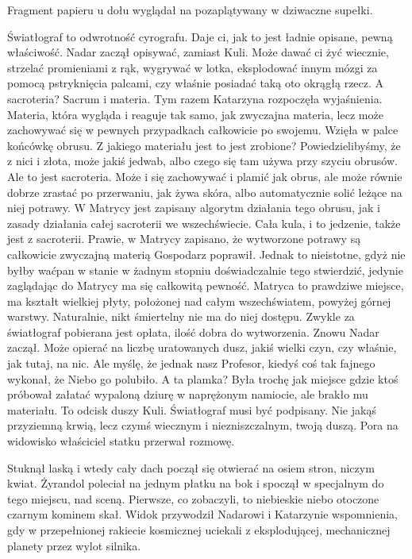 Fragment papieru u dołu wyglądał na pozaplątywany w dziwaczne supełki.

\begin{dialogue}
\ds{} Światłograf to odwrotność cyrografu. Daje ci, jak to jest ładnie opisane, pewną właściwość. \dm{} Nadar zaczął opisywać, zamiast Kuli. \dm{}
Może dawać ci żyć wiecznie, strzelać promieniami z rąk, wygrywać w lotka, eksplodować innym mózgi za pomocą pstryknięcia palcami, czy właśnie posiadać taką oto okrągłą rzecz.
\ds{} A sacroteria? 
\ds{} Sacrum i materia. \dm{} Tym razem Katarzyna rozpoczęła wyjaśnienia. \dm{} 
Materia, która wygląda i reaguje tak samo, jak zwyczajna materia, lecz może zachowywać się w pewnych przypadkach całkowicie po swojemu. \dm{} 
Wzięła w palce końcówkę obrusu. \dm{} Z jakiego materiału jest to jest zrobione? 
Powiedzielibyśmy, że z nici i złota, może jakiś jedwab, albo czego się tam używa przy szyciu obrusów.
Ale to jest sacroteria. Może i się zachowywać i plamić jak obrus, ale może równie dobrze zrastać po przerwaniu, jak żywa skóra, albo automatycznie solić leżące na niej potrawy.
W Matrycy jest zapisany algorytm działania tego obrusu, jak i zasady działania całej sacroterii we wszechświecie. 
Cała kula, i to jedzenie, także jest z sacroterii.
\ds{} Prawie, w Matrycy zapisano, że wytworzone potrawy są całkowicie zwyczajną materią \dm{} Gospodarz poprawił. \dm{}
Jednak to nieistotne, gdyż nie byłby waćpan w stanie w żadnym stopniu doświadczalnie tego stwierdzić, jedynie zaglądając do Matrycy ma się całkowitą pewność. 
Matryca to prawdziwe miejsce, ma kształt wielkiej płyty, położonej nad całym wszechświatem, powyżej górnej warstwy. Naturalnie, nikt śmiertelny nie ma do niej dostępu.
\ds{} Zwykle za światłograf pobierana jest opłata, ilość dobra do wytworzenia. \dm{} Znowu Nadar zaczął. \dm{} 
Może opierać na liczbę uratowanych dusz, jakiś wielki czyn, czy właśnie, jak tutaj, na nic. 
Ale myślę, że jednak nasz Profesor, kiedyś coś tak fajnego wykonał, że Niebo go polubiło.
\ds{} A ta plamka? \dm{} Była trochę jak miejsce gdzie ktoś próbował załatać wypaloną dziurę w naprężonym namiocie, ale brakło mu materiału.
\ds{} To odcisk duszy Kuli. Światłograf musi być podpisany. Nie jakąś przyziemną krwią, lecz czymś wiecznym i niezniszczalnym, twoją duszą.
\ds{} Pora na widowisko \dm{} właściciel statku przerwał rozmowę.
\end{dialogue}

Stuknął laską i wtedy cały dach począł się otwierać na osiem stron, niczym kwiat. 
Żyrandol poleciał na jednym płatku na bok i spoczął w specjalnym do tego miejscu, nad sceną.
Pierwsze, co zobaczyli, to niebieskie niebo otoczone czarnym kominem skał.
Widok przywodził Nadarowi i Katarzynie wspomnienia, gdy w przepełnionej rakiecie kosmicznej uciekali z eksplodującej, mechanicznej planety przez wylot silnika.

